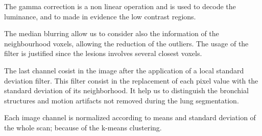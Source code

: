 \documentclass{standalone}
\begin{document}
		The gamma correction is a non linear operation and is used to decode the luminance, and to made in evidence the low contrast regions. 
		
		The median blurring allow us to consider also the information of the neighbourhood voxels, allowing the reduction of the outliers. The usage of the filter is justified since the lesions involves several closest voxels.
		
		The last channel cosist in the image after the application of a local standard deviation filter. This filter consist in the replacement of each pixel value with the standard deviation of its neighborhood. It help us to distinguish the bronchial structures and motion artifacts not removed during the lung segmentation.	
		
		Each image channel is normalized according to means and standard deviation of the whole scan; because of the k-means clustering.
\end{document}
